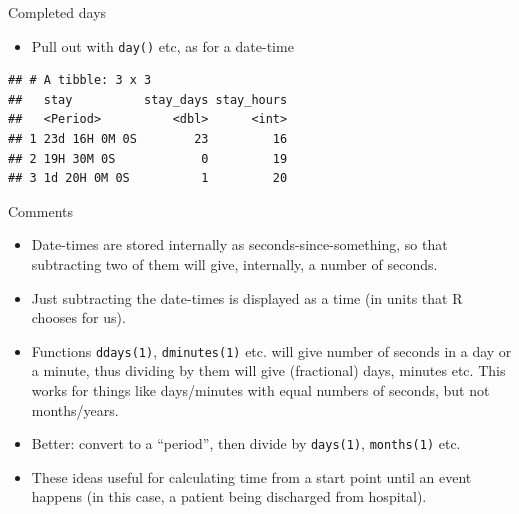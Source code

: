 \documentclass[ignorenonframetext,]{beamer}
\newenvironment{Shaded}{\begin{snugshade}}{\end{snugshade}}
\newcommand{\DataTypeTok}[1]{\textcolor[rgb]{0.13,0.29,0.53}{#1}}
\newcommand{\KeywordTok}[1]{\textcolor[rgb]{0.13,0.29,0.53}{\textbf{#1}}}
\newcommand{\NormalTok}[1]{#1}
\newcommand{\OperatorTok}[1]{\textcolor[rgb]{0.81,0.36,0.00}{\textbf{#1}}}
\newcommand{\StringTok}[1]{\textcolor[rgb]{0.31,0.60,0.02}{#1}}
\providecommand{\tightlist}{%
  \setlength{\itemsep}{0pt}\setlength{\parskip}{0pt}}
\begin{document}
\begin{frame}[fragile]{Completed days}
\protect\hypertarget{completed-days}{}

\begin{itemize}
\tightlist
\item
  Pull out with \texttt{day()} etc, as for a date-time
\end{itemize}

\begin{Shaded}
\end{Shaded}

\begin{verbatim}
## # A tibble: 3 x 3
##   stay          stay_days stay_hours
##   <Period>          <dbl>      <int>
## 1 23d 16H 0M 0S        23         16
## 2 19H 30M 0S            0         19
## 3 1d 20H 0M 0S          1         20
\end{verbatim}

\end{frame}

\begin{frame}[fragile]{Comments}
\protect\hypertarget{comments}{}

\begin{itemize}
\tightlist
\item
  Date-times are stored internally as seconds-since-something, so that
  subtracting two of them will give, internally, a number of seconds.
\item
  Just subtracting the date-times is displayed as a time (in units that
  R chooses for us).
\item
  Functions \texttt{ddays(1)}, \texttt{dminutes(1)} etc. will give
  number of seconds in a day or a minute, thus dividing by them will
  give (fractional) days, minutes etc. This works for things like
  days/minutes with equal numbers of seconds, but not months/years.
\item
  Better: convert to a ``period'', then divide by \texttt{days(1)},
  \texttt{months(1)} etc.
\item
  These ideas useful for calculating time from a start point until an
  event happens (in this case, a patient being discharged from
  hospital).
\end{itemize}

\end{frame}
\end{document}
